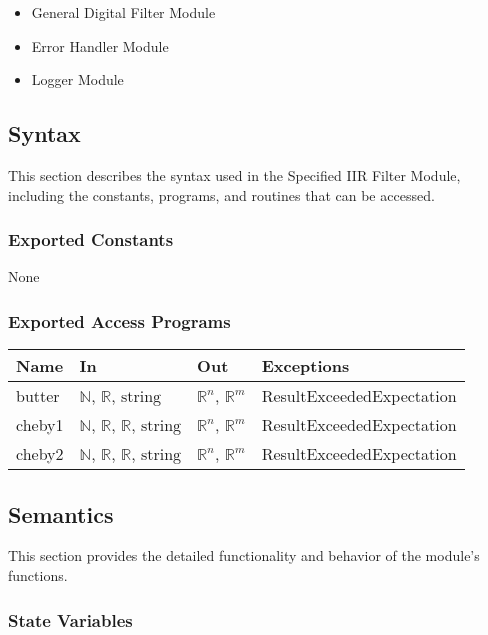 \documentclass[12pt, titlepage]{article}
\begin{document}
\begin{itemize}
\item General Digital Filter Module
\item Error Handler Module
\item Logger Module
\end{itemize}

\subsection{Syntax}

This section describes the syntax used in the Specified IIR Filter Module,
including the constants, programs, and routines that can be accessed.

\subsubsection{Exported Constants}

None

\subsubsection{Exported Access Programs}

\begin{center}
\begin{tabular}{p{2cm} p{4cm} p{4cm} p{5cm}}
\hline
\textbf{Name} & \textbf{In} & \textbf{Out} & \textbf{Exceptions} \\
\hline
butter & $\mathbb{N}$, $\mathbb{R}$, $\text{string}$ & $\mathbb{R}^{n}$,
$\mathbb{R}^{m}$ & ResultExceededExpectation \\
cheby1 & $\mathbb{N}$, $\mathbb{R}$, $\mathbb{R}$, $\text{string}$ &
$\mathbb{R}^{n}$, $\mathbb{R}^{m}$ & ResultExceededExpectation \\
cheby2 & $\mathbb{N}$, $\mathbb{R}$, $\mathbb{R}$, $\text{string}$ &
$\mathbb{R}^{n}$, $\mathbb{R}^{m}$ & ResultExceededExpectation \\
\hline
\end{tabular}
\end{center}

\subsection{Semantics}

This section provides the detailed functionality and behavior of the module’s
functions.

\subsubsection{State Variables}
\end{document}
